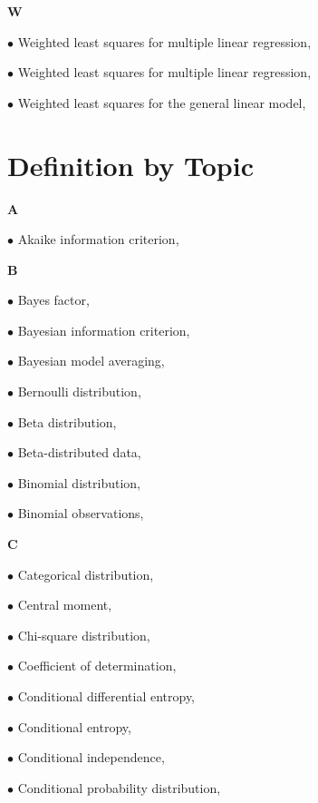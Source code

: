 \documentclass[a4paper,12pt,twoside]{book}
\begin{document}
\vspace{1em}
\textbf{W}

$\bullet$ Weighted least squares for multiple linear regression, \pageref{sec:mlr-wls}

$\bullet$ Weighted least squares for multiple linear regression, \pageref{sec:mlr-wls2}

$\bullet$ Weighted least squares for the general linear model, \pageref{sec:glm-wls}




\pagebreak
\section{Definition by Topic}

\textbf{A}

$\bullet$ Akaike information criterion, \pageref{sec:aic}


\vspace{1em}
\textbf{B}

$\bullet$ Bayes factor, \pageref{sec:bf}

$\bullet$ Bayesian information criterion, \pageref{sec:bic}

$\bullet$ Bayesian model averaging, \pageref{sec:bma}

$\bullet$ Bernoulli distribution, \pageref{sec:bern}

$\bullet$ Beta distribution, \pageref{sec:beta}

$\bullet$ Beta-distributed data, \pageref{sec:beta-data}

$\bullet$ Binomial distribution, \pageref{sec:bin}

$\bullet$ Binomial observations, \pageref{sec:bin-data}


\vspace{1em}
\textbf{C}

$\bullet$ Categorical distribution, \pageref{sec:cat}

$\bullet$ Central moment, \pageref{sec:mom-cent}

$\bullet$ Chi-square distribution, \pageref{sec:chi2}

$\bullet$ Coefficient of determination, \pageref{sec:rsq}

$\bullet$ Conditional differential entropy, \pageref{sec:dent-cond}

$\bullet$ Conditional entropy, \pageref{sec:ent-cond}

$\bullet$ Conditional independence, \pageref{sec:ind-cond}

$\bullet$ Conditional probability distribution, \pageref{sec:dist-cond}
\end{document}
